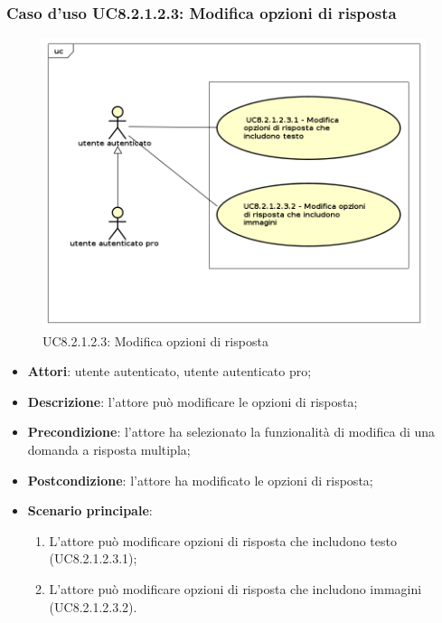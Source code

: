 \subsubsection{Caso d'uso UC8.2.1.2.3: Modifica opzioni di risposta}
	\label{UC8.2.1.2.3}
	\begin{figure}[h]
		\centering
			\includegraphics[scale=0.45,keepaspectratio]{UML/UC8_2_1_2_3.png}
		\caption{UC8.2.1.2.3: Modifica opzioni di risposta}
	\end{figure}
	\FloatBarrier
	\begin{itemize}
		\item
			\textbf{Attori}: utente autenticato, utente autenticato pro;
		\item		
			\textbf{Descrizione}: l'attore può modificare le opzioni di risposta;
		\item
			\textbf{Precondizione}: l'attore ha selezionato la funzionalità di modifica di una domanda a risposta multipla; 
		\item
			\textbf{Postcondizione}: l'attore ha modificato le opzioni di risposta;
		\item
			\textbf{Scenario principale}:
	       		\begin{enumerate}
	       			\item
	       			L'attore può modificare opzioni di risposta che includono testo (UC8.2.1.2.3.1);
					\item
					L'attore può modificare opzioni di risposta che includono immagini (UC8.2.1.2.3.2).
	 			\end{enumerate}
	\end{itemize}	
	
